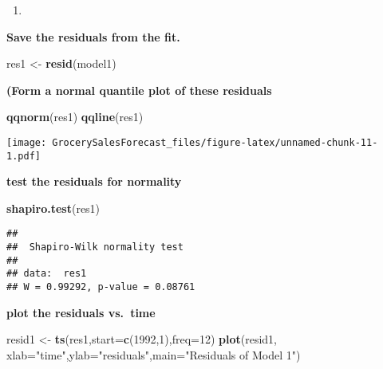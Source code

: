 \documentclass[
]{article}
\newenvironment{Shaded}{\begin{snugshade}}{\end{snugshade}}
\newcommand{\AttributeTok}[1]{\textcolor[rgb]{0.13,0.29,0.53}{#1}}
\newcommand{\DecValTok}[1]{\textcolor[rgb]{0.00,0.00,0.81}{#1}}
\newcommand{\FunctionTok}[1]{\textcolor[rgb]{0.13,0.29,0.53}{\textbf{#1}}}
\newcommand{\NormalTok}[1]{#1}
\newcommand{\OtherTok}[1]{\textcolor[rgb]{0.56,0.35,0.01}{#1}}
\newcommand{\StringTok}[1]{\textcolor[rgb]{0.31,0.60,0.02}{#1}}
\providecommand{\tightlist}{%
  \setlength{\itemsep}{0pt}\setlength{\parskip}{0pt}}
\begin{document}
\begin{enumerate}
\def\labelenumi{(\alph{enumi})}
\setcounter{enumi}{1}
\tightlist
\item
\end{enumerate}

\textbf{Save the residuals from the fit. }

\begin{Shaded}
\begin{Highlighting}[]
\NormalTok{res1 }\OtherTok{\textless{}{-}} \FunctionTok{resid}\NormalTok{(model1)}
\end{Highlighting}
\end{Shaded}

\textbf{(Form a normal quantile plot of these residuals}

\begin{Shaded}
\begin{Highlighting}[]
\FunctionTok{qqnorm}\NormalTok{(res1)}
\FunctionTok{qqline}\NormalTok{(res1)}
\end{Highlighting}
\end{Shaded}

\texttt{[image: GrocerySalesForecast\_files/figure-latex/unnamed-chunk-11-1.pdf]}

\textbf{test the residuals for normality}

\begin{Shaded}
\begin{Highlighting}[]
\FunctionTok{shapiro.test}\NormalTok{(res1)}
\end{Highlighting}
\end{Shaded}

\begin{verbatim}
## 
##  Shapiro-Wilk normality test
## 
## data:  res1
## W = 0.99292, p-value = 0.08761
\end{verbatim}

\textbf{plot the residuals vs.~time}

\begin{Shaded}
\begin{Highlighting}[]
\NormalTok{resid1 }\OtherTok{\textless{}{-}} \FunctionTok{ts}\NormalTok{(res1,}\AttributeTok{start=}\FunctionTok{c}\NormalTok{(}\DecValTok{1992}\NormalTok{,}\DecValTok{1}\NormalTok{),}\AttributeTok{freq=}\DecValTok{12}\NormalTok{)}
\FunctionTok{plot}\NormalTok{(resid1, }\AttributeTok{xlab=}\StringTok{"time"}\NormalTok{,}\AttributeTok{ylab=}\StringTok{"residuals"}\NormalTok{,}\AttributeTok{main=}\StringTok{"Residuals of Model 1"}\NormalTok{)}
\end{Highlighting}
\end{Shaded}
\end{document}
